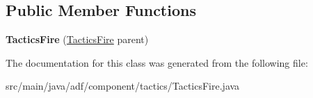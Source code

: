 \subsection*{Public Member Functions}
\begin{DoxyCompactItemize}
\item 
\hypertarget{classadf_1_1component_1_1tactics_1_1TacticsFire_a31074d71861fe05becde32e81ee42ad5}{}\label{classadf_1_1component_1_1tactics_1_1TacticsFire_a31074d71861fe05becde32e81ee42ad5} 
{\bfseries Tactics\+Fire} (\hyperlink{classadf_1_1component_1_1tactics_1_1TacticsFire}{Tactics\+Fire} parent)
\end{DoxyCompactItemize}


The documentation for this class was generated from the following file\+:\begin{DoxyCompactItemize}
\item 
src/main/java/adf/component/tactics/Tactics\+Fire.\+java\end{DoxyCompactItemize}
